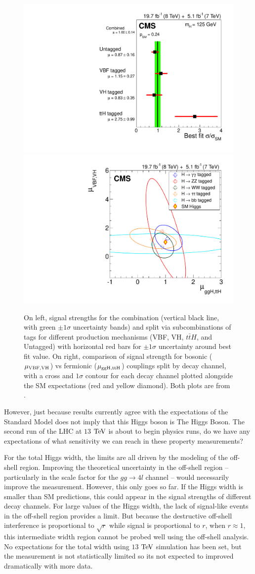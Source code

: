 \begin{figure}[htbp]
\begin{center}
\includegraphics[width=.45\linewidth]{Conclusions/figures/sqr_mlz_ccc_mH125_prod.pdf}
\includegraphics[width=.45\linewidth]{Conclusions/figures/sqr_rvrf_scan_2d_all_68.pdf}
\caption[Higgs Boson Signal Strength for CMS Combination Split by Production]{On left, signal strengths for the combination (vertical black line, with green $\pm1\sigma$ uncertainty bands) and split via subcombinations of tags for different production mechanisms (VBF, VH, $t\bar{t}H$, and Untagged) with horizontal red bars for $\pm1\sigma$ uncertainty around best fit value. On right, comparison of signal strength for bosonic ($\mu_{\rm VBF,VH}$) vs fermionic ($\mu_{\rm ggH,ttH}$) couplings split by decay channel, with a cross and $1\sigma$ contour for each decay channel plotted alongside the SM expectations (red and yellow diamond). Both plots are from \cite{Khachatryan:2014jba}.}
\label{fig:CombHiggsProd}
\end{center}
\end{figure}

However, just because results currently agree with the expectations of the Standard Model does not imply that this Higgs boson is The Higgs Boson. The second run of the LHC at $13$ $\rm{TeV}$ is about to begin physics runs, do we have any expectations of what sensitivity we can reach in these property measurements?

For the total Higgs width, the limits are all driven by the modeling of the off-shell region. Improving the theoretical uncertainty in the off-shell region -- particularly in the scale factor for the $gg\rightarrow 4l$ channel -- would necessarily improve the measurement. However, this only goes so far. If the Higgs width is smaller than SM predictions, this could appear in the signal strengths of different decay channels. For large values of the Higgs width, the lack of signal-like events in the off-shell region provides a limit. But because the destructive off-shell interference is proportional to $\sqrt{r}$ while signal is proportional to $r$, when $r\approx1$, this intermediate width region cannot be probed well using the off-shell analysis. No expectations for the total width using $13$ $\rm{TeV}$ simulation has been set, but the measurement is not statistically limited so its not expected to improved dramatically with more data.

